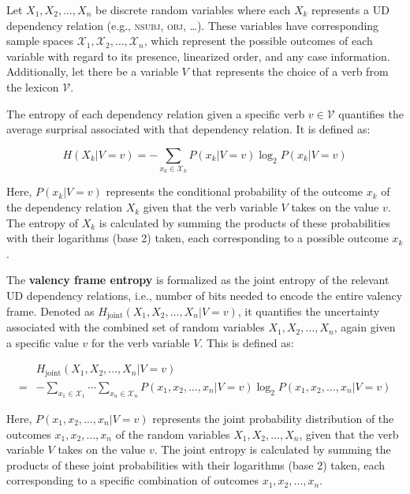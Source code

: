 Let $X_1, X_2,\ldots,X_n$ be discrete random variables where each $X_k$ represents a UD dependency relation (e.g., \textsc{nsubj}, \textsc{obj}, \ldots). These variables have corresponding sample spaces $\mathcal{X}_1, \mathcal{X}_2, \ldots, \mathcal{X}_n$, which represent the possible outcomes of each variable with regard to its presence, linearized order, and any case information. Additionally, let there be a variable $V$ that represents the choice of a verb from the lexicon $\mathcal{V}$. 

The entropy of each dependency relation given a specific verb $v \in \mathcal{V}$ quantifies the average surprisal associated with that dependency relation. It is defined as:

\begin{equation*}
  H(X_{k}|V=v)=
  -\sum\limits_{x_{k}\in{}\mathcal{X}_{k}}{P(x_{k}|V=v)\log_{2}{P(x_{k}|V=v)}}  
\end{equation*}

Here, $P(x_k | V = v)$ represents the conditional probability of the outcome $x_k$ of the dependency relation $X_k$ given that the verb variable $V$ takes on the value $v$. The entropy of $X_k$ is calculated by summing the products of these probabilities with their logarithms (base 2) taken, each corresponding to a possible outcome $x_k$.

The \textbf{valency frame entropy} is formalized as the joint entropy of the relevant UD dependency relations, i.e., number of bits needed to encode the entire valency frame. Denoted as $H_{\text{joint}}(X_1, X_2, \ldots, X_n | V = v)$, it quantifies the uncertainty associated with the combined set of random variables $X_1, X_2, \ldots, X_n$, again given a specific value $v$ for the verb variable $V$. This is defined as:

\begin{equation*}
\begin{split}
 & H_{\text{joint}}(X_1, X_2, \ldots, X_n | V=v) \\
=& -\sum\limits_{x_1\in{}\mathcal{X}_1}\cdots\sum\limits_{x_n\in{}\mathcal{X}_n}{P(x_1, x_2, \ldots,x_{n}|V=v)\log_2P(x_1, x_2, \ldots,x_n|V=v)}
\end{split}
\end{equation*}

Here, $P(x_1, x_2, \ldots, x_n | V = v)$ represents the joint probability distribution of the outcomes $x_1, x_2, \ldots, x_n$ of the random variables $X_1, X_2, \ldots, X_n$, given that the verb variable $V$ takes on the value $v$. The joint entropy is calculated by summing the products of these joint probabilities with their logarithms (base 2) taken, each corresponding to a specific combination of outcomes $x_1, x_2, \ldots, x_n$.

